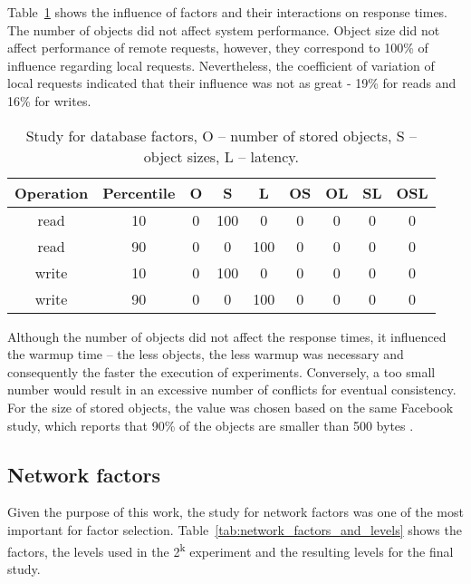 \documentclass[man,floatsintext,12pt]{apa6}
\begin{document}
Table~\ref{tab:estudo_para_fatores_de_banco_de_dados} shows the influence of
factors and their interactions on response times. The number of objects did not
affect system performance. Object size did not affect performance of remote
requests, however, they correspond to 100\% of influence regarding local
requests. Nevertheless, the coefficient of variation of local requests
indicated that their influence was not as great - 19\% for reads and 16\% for
writes.

\begin{table}[h!]
  \caption{Study for database factors, O -- number of stored objects, S -- object
sizes, L -- latency.}
  \begin{tabular}{ccccccccc}         \toprule
Operation & Percentile & O & S & L & OS & OL & SL & OSL\\ \midrule

read & 10 & 0 & 100 & 0 & 0 & 0 & 0 & 0 \\

read & 90 & 0 & 0 & 100 & 0 & 0 & 0 & 0 \\

write & 10 & 0 & 100 & 0 & 0 & 0 & 0 & 0 \\

write & 90 & 0 & 0 & 100 & 0 & 0 & 0 & 0 \\ \bottomrule
  \end{tabular}
  \label{tab:estudo_para_fatores_de_banco_de_dados}
\end{table}

Although the number of objects did not affect the response times, it influenced
the warmup time -- the less objects, the less warmup was necessary and
consequently the faster the execution of experiments. Conversely, a too small
number would result in an excessive number of conflicts for eventual
consistency. For the size of stored objects, the value was chosen based on the
same Facebook study, which reports that 90\% of the objects are smaller than
500 bytes \parencite{Atikoglu2012}.

\subsection{Network factors}

Given the purpose of this work, the study for network factors was one of the
most important for factor selection. Table~\ref{tab:network_factors_and_levels}
shows the factors, the levels used in the 2\textsuperscript{k} experiment and
the resulting levels for the final study.
\end{document}
